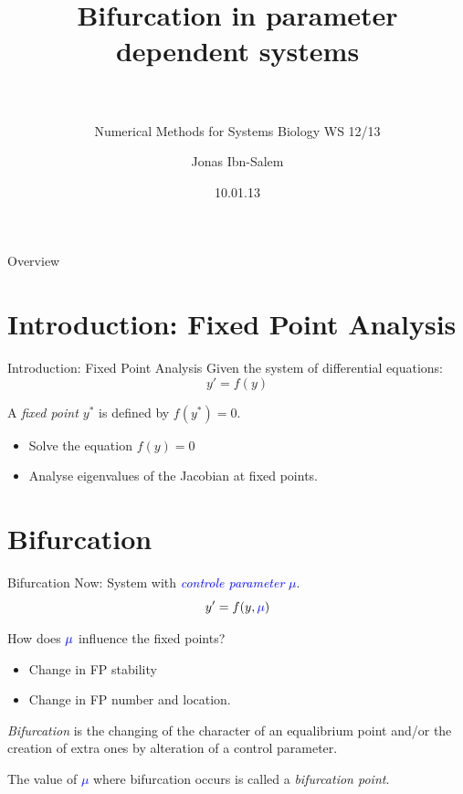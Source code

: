 \documentclass{beamer}
\title[Bifurcation]{Bifurcation in parameter dependent systems\\~\\}
\subtitle{Numerical Methods for Systems Biology WS 12/13}
\author[Jonas Ibn-Salem]{Jonas Ibn-Salem}
\institute[]{}
\date{10.01.13}
\begin{document}
\maketitle


\begin{frame}{Overview}
    \tableofcontents
\end{frame}

\section{Introduction: Fixed Point Analysis}
\begin{frame}{Introduction: Fixed Point Analysis}
    Given the system of differential equations:
    $$y' = f(y) $$
    \begin{definition}
        A \emph{fixed point $y^*$} is defined by $f(y^*)=0$.
    \end{definition}
    \begin{itemize}
        \item Solve the equation $f(y) = 0$ 
        \item Analyse eigenvalues of the Jacobian at fixed points.
    \end{itemize}
\end{frame}
\section{Bifurcation}

\begin{frame}{Bifurcation}
    Now: System with \textcolor{blue}{\emph{controle parameter} $\mu$}. 
    $$y' = f(y, \textcolor{blue}{\mu})$${}    

    \begin{block}{}
        How does $\textcolor{blue}{\mu}$ influence the fixed points?
    \end{block}

    \pause
    \begin{itemize}
        \item Change in FP stability
        \item Change in FP number and location.
    \end{itemize}
    
    \pause
    \begin{definition}
        \emph{Bifurcation} is the changing of the character of an equalibrium point and/or the creation of extra ones by alteration of a control parameter.
    \end{definition}

    The value of \textcolor{blue}{$\mu$} where bifurcation occurs is called a \emph{bifurcation point}.
\end{frame}
\end{document}
